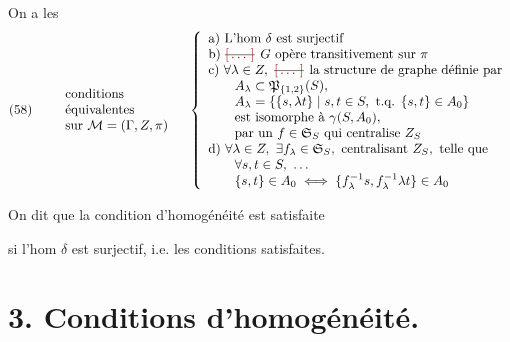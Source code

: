 \documentclass[11pt,a4paper]{article}
\begin{document}
On a les
\[
(58) \qquad
\begin{array}{l}
\text{conditions} \\
\text{équivalentes} \\
\text{sur } \mathcal{M} = (\Gamma, Z, \pi)
\end{array}
\quad
\left\{
\begin{array}{l}
\text{a) L'hom } \delta \text{ est surjectif} \\
\text{b) \struck{\ill{}} $G$ opère transitivement sur } \pi \\
\text{c) } \forall \lambda \in Z, \text{ \struck{\ill{}} la structure de graphe définie par} \\
\qquad A_{\lambda} \subset \mathfrak{P}_{\{1,2\}}(S), \\
\qquad A_{\lambda} = \{\{s, \lambda t\} \mid s, t \in S,\ \text{t.q. } \{s,t\} \in A_0\} \\
\qquad \text{est isomorphe à } \gamma(S, A_0), \\
\qquad \text{par un } f \in \mathfrak{S}_S \text{ qui centralise } Z_S \\
\text{d) } \forall \lambda \in Z,\ \exists f_{\lambda} \in \mathfrak{S}_S, \text{ centralisant } Z_S, \text{ telle que} \\
\qquad \forall s, t \in S, \ \ldots \\
\qquad \{s,t\} \in A_0 \iff \{f_{\lambda}^{-1} s, f_{\lambda}^{-1} \lambda t\} \in A_0
\end{array}
\right.
\]

On dit que la condition d'homogénéité est satisfaite

si l'hom $\delta$ est surjectif, i.e. les conditions  satisfaites.



\section*{3. Conditions d'homogénéité.}
\end{document}

